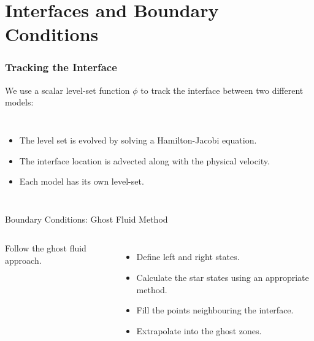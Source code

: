 \documentclass{beamer}
\begin{document}
\section{Interfaces and Boundary Conditions}


\begin{frame}
\frametitle{Tracking the Interface}
We use a scalar level-set function $\phi$ to track the interface between two different models:
\begin{columns}
\column{5cm}
\begin{itemize}
\item{The level set is evolved by solving a Hamilton-Jacobi equation.}
\item{The interface location is advected along with the physical velocity.}
\item{Each model has its own level-set.}
\end{itemize}
\column{5cm}
\end{columns}
\end{frame}


\begin{frame}{Boundary Conditions: Ghost Fluid Method}
\begin{columns}
\column{6.5cm}
\centering
\column{4.5cm}
Follow the ghost fluid approach.
\begin{itemize}
\item{Define left and right states.}
\item{Calculate the star states using an appropriate method.}
\item{Fill the points neighbouring the interface.}
\item{Extrapolate into the ghost zones.}
\end{itemize}
\end{columns}
\end{frame}
\end{document}
